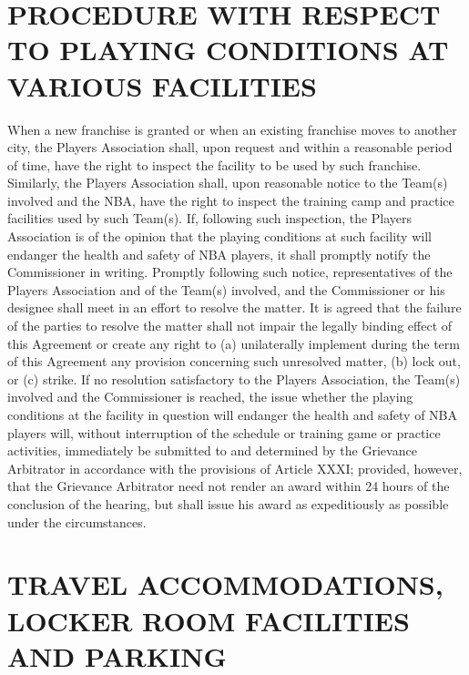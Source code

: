 \documentclass[
]{book}
\begin{document}
\hypertarget{procedure-with-respect-to-playing-conditions-at-various-facilities}{%
\chapter{PROCEDURE WITH RESPECT TO PLAYING CONDITIONS AT VARIOUS FACILITIES}\label{procedure-with-respect-to-playing-conditions-at-various-facilities}}


When a new franchise is granted or when an existing franchise moves to another city, the Players Association shall, upon request and within a reasonable period of time, have the right to inspect the facility to be used by such franchise. Similarly, the Players Association shall, upon reasonable notice to the Team(s) involved and the NBA, have the right to inspect the training camp and practice facilities used by such Team(s). If, following such inspection, the Players Association is of the opinion that the playing conditions at such facility will endanger the health and safety of NBA players, it shall promptly notify the Commissioner in writing. Promptly following such notice, representatives of the Players Association and of the Team(s) involved, and the Commissioner or his designee shall meet in an effort to resolve the matter. It is agreed that the failure of the parties to resolve the matter shall not impair the legally binding effect of this Agreement or create any right to (a) unilaterally implement during the term of this Agreement any provision concerning such unresolved matter, (b) lock out, or (c) strike. If no resolution satisfactory to the Players Association, the Team(s) involved and the Commissioner is reached, the issue whether the playing conditions at the facility in question will endanger the health and safety of NBA players will, without interruption of the schedule or training game or practice activities, immediately be submitted to and determined by the Grievance Arbitrator in accordance with the provisions of Article XXXI; provided, however, that the Grievance Arbitrator need not render an award within 24 hours of the conclusion of the hearing, but shall issue his award as expeditiously as possible under the circumstances.

\hypertarget{travel-accommodations-locker-room-facilities-and-parking}{%
\chapter{TRAVEL ACCOMMODATIONS, LOCKER ROOM FACILITIES AND PARKING}\label{travel-accommodations-locker-room-facilities-and-parking}}
\end{document}
